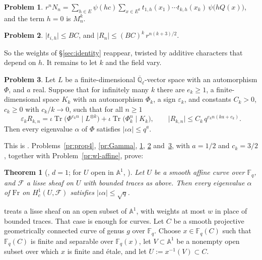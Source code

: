 \documentclass[reqno]{amsart}
\theoremstyle{definition}
\newtheorem{problem}{Problem}[section]
\theoremstyle{plain}
\newtheorem{theorem}{Theorem}[section]
\newcommand{\Q}{\mathbb{Q}}
\newcommand{\F}{\mathbb{F}}
\newcommand{\A}{\mathbb{A}}
\newcommand{\Ql}{\overline{\Q}_\ell}
\newcommand{\cF}{\mathcal{F}}
\newcommand{\Fr}{\mathrm{Fr}}
\newcommand{\Tr}{\operatorname{Tr}}
\begin{document}
\begin{problem}\label{pr:char-sum}
\(r^n N_n = \sum_{h \in E} \psi(hc) \sum_{x \in E^k} t_{1,h}(x_1) \cdots t_{k,h}(x_k)\, \psi\bigl(hQ(x)\bigr)\), and the term \(h = 0\) is \(M_n^k\).
\end{problem}

\begin{problem}\label{pr:R-curve}
\(\lvert t_{i,h} \rvert \le BC\), and \(\lvert R_n \rvert \le (BC)^k\, r^{n(k+3)/2}\).
\end{problem}

So the weights of \S\ref{sec:identity} reappear, twisted by additive characters that depend on \(h\).  It remains to let \(k\) and the field vary.

\begin{problem}\label{pr:lemma2}
Let \(L\) be a finite-dimensional \(\Ql\)-vector space with an automorphism \(\Phi\), and \(a\) real.  Suppose that for infinitely many \(k\) there are \(e_k \ge 1\), a finite-dimensional space \(K_k\) with an automorphism \(\Phi_k\), a sign \(\varepsilon_k\), and constants \(C_k > 0\), \(c_k \ge 0\) with \(c_k/k \to 0\), such that for all \(n \ge 1\)
\[
  \varepsilon_k R_{k,n} = \iota\Tr\bigl(\Phi^{e_kn} \mid L^{\otimes k}\bigr) + \iota\Tr\bigl(\Phi_k^n \mid K_k\bigr), \qquad \lvert R_{k,n} \rvert \le C_k\, q^{e_kn(ka + c_k)} .
\]
Then every eigenvalue \(\alpha\) of \(\Phi\) satisfies \(\lvert \iota\alpha \rvert \le q^a\).
\end{problem}

This is \cite[Lemma~2]{Ald}.  Problems~\ref{pr:prop4}, \ref{pr:Gamma}, \ref{pr:char-sum}, \ref{pr:R-curve} and~\ref{pr:lemma2}, with \(a = 1/2\) and \(c_k = 3/2\), together with Problem~\ref{pr:wl-affine}, prove:

\begin{theorem}[{\cite[Theorem~9]{Ald}, \(d = 1\); for \(U\) open in \(\A^1\), \cite[Theorem~1.1 and Remark~1.2]{Zh}}]\label{th:curve-lowest}
Let \(U\) be a smooth affine curve over \(\F_q\), and \(\cF\) a lisse sheaf on \(U\) with bounded traces as above.  Then every eigenvalue \(\alpha\) of \(\Fr\) on \(H^1_c(U, \cF)\) satisfies \(\lvert \iota\alpha \rvert \le \sqrt q\).
\end{theorem}

\cite{Zh} treats a lisse sheaf on an open subset of \(\A^1\), with weights at most \(w\) in place of bounded traces.  That case is enough for curves.  Let \(C\) be a smooth projective geometrically connected curve of genus \(g\) over \(\F_q\).  Choose \(x \in \F_q(C)\) such that \(\F_q(C)\) is finite and separable over \(\F_q(x)\), let \(V \subset \A^1\) be a nonempty open subset over which \(x\) is finite and étale, and let \(U := x^{-1}(V) \subset C\).
\end{document}
